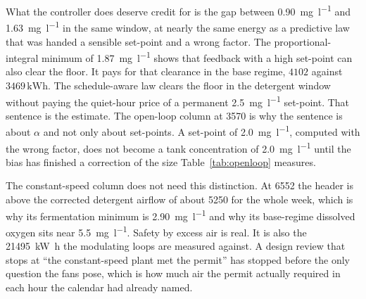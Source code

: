 What the controller does deserve credit for is the gap between \SI{0.90}{\milli\gram\per\litre} and \SI{1.63}{\milli\gram\per\litre} in the same window, at nearly the same energy as a predictive law that was handed a sensible set-point and a wrong factor. The proportional-integral minimum of \SI{1.87}{\milli\gram\per\litre} shows that feedback with a high set-point can also clear the floor. It pays for that clearance in the base regime, $4102$ against $3469\,\mathrm{kWh}$. The schedule-aware law clears the floor in the detergent window without paying the quiet-hour price of a permanent \SI{2.5}{\milli\gram\per\litre} set-point. That sentence is the estimate. The open-loop column at \SI{3570}{\nmcph} is why the sentence is about $\alpha$ and not only about set-points. A set-point of \SI{2.0}{\milli\gram\per\litre}, computed with the wrong factor, does not become a tank concentration of \SI{2.0}{\milli\gram\per\litre} until the bias has finished a correction of the size Table~\ref{tab:openloop} measures.

The constant-speed column does not need this distinction. At \SI{6552}{\nmcph} the header is above the corrected detergent airflow of about \SI{5250}{\nmcph} for the whole week, which is why its fermentation minimum is \SI{2.90}{\milli\gram\per\litre} and why its base-regime dissolved oxygen sits near \SI{5.5}{\milli\gram\per\litre}. Safety by excess air is real. It is also the \SI{21495}{\kilo\watt\hour} the modulating loops are measured against. A design review that stops at ``the constant-speed plant met the permit'' has stopped before the only question the fans pose, which is how much air the permit actually required in each hour the calendar had already named.

